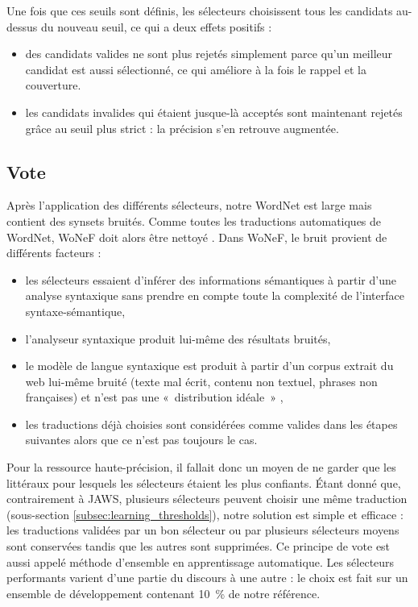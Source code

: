 Une fois que ces seuils sont définis, les sélecteurs choisissent tous les candidats au-dessus du nouveau seuil, ce qui a deux effets positifs :

\begin{itemize}
    \item des candidats valides ne sont plus rejetés simplement parce qu'un meilleur candidat est aussi sélectionné, ce qui améliore à la fois le rappel et la couverture.
    \item les candidats invalides qui étaient jusque-là acceptés sont maintenant rejetés grâce au seuil plus strict : la précision s'en retrouve augmentée.
\end{itemize}

\subsection{Vote}
\label{subsec:voting}

Après l'application des différents sélecteurs, notre WordNet est large mais contient des synsets bruités. Comme toutes les traductions automatiques de WordNet, WoNeF doit alors être nettoyé \citep{sagot2012cleaning}. Dans WoNeF, le bruit provient de différents facteurs :

\begin{itemize}
    \item les sélecteurs essaient d'inférer des informations sémantiques à partir d'une analyse syntaxique sans prendre en compte toute la complexité de l'interface syntaxe-sémantique,
    \item l'analyseur syntaxique produit lui-même des résultats bruités,
    \item le modèle de langue syntaxique est produit à partir d'un corpus extrait du web lui-même bruité (texte mal écrit, contenu non textuel, phrases non françaises) et n'est pas une «~distribution idéale~» \citep{copestake2013lexicalised},
    \item les traductions déjà choisies sont considérées comme valides dans les étapes suivantes alors que ce n'est pas toujours le cas.
\end{itemize}

Pour la ressource haute-précision, il fallait donc un moyen de ne garder que les littéraux pour lesquels les sélecteurs étaient les plus confiants. Étant donné que, contrairement à JAWS, plusieurs sélecteurs peuvent choisir une même traduction (sous-section \ref{subsec:learning_thresholds}), notre solution est simple et efficace : les traductions validées par un bon sélecteur ou par plusieurs sélecteurs moyens sont conservées tandis que les autres sont supprimées. Ce principe de vote est aussi appelé méthode d'ensemble en apprentissage automatique. Les sélecteurs performants varient d'une partie du discours à une autre : le choix est fait sur un ensemble de développement contenant 10~\% de notre référence.

